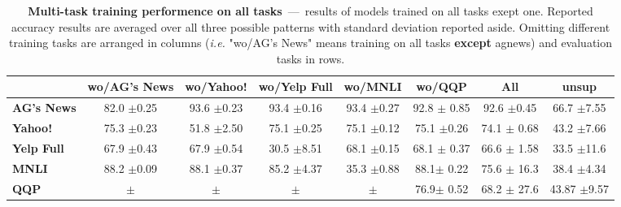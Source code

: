 \begin{table*}[ht]
	\centering
	\fontsize{9}{13}
	\selectfont
	\begin{tabular*}{\textwidth}{l@{\extracolsep{\fill}}ccccccc}
		\toprule
		& \textbf{wo/AG's News} & \textbf{wo/Yahoo!} & \textbf{wo/Yelp Full} & \textbf{wo/MNLI} & \textbf{wo/QQP} & \textbf{All} & \textbf{unsup} \\
		\hline
		\textbf{AG's News}    & 82.0 \tiny$\pm$0.25        & 93.6 \tiny$\pm$0.23        & 93.4   \tiny$\pm$0.16          & 93.4 \tiny$\pm$0.27       & 92.8 \tiny$\pm$ 0.85 & 92.6 \tiny$\pm$0.45 & 66.7 \tiny$\pm$7.55 \\
		\textbf{Yahoo!}     & 75.3 \tiny$\pm$0.23        & 51.8 \tiny$\pm$2.50        & 75.1   \tiny$\pm$0.25          & 75.1 \tiny$\pm$0.12       & 75.1 \tiny$\pm$0.26 & 74.1 \tiny$\pm$ 0.68  & 43.2 \tiny$\pm$7.66 \\
		\textbf{Yelp Full} & 67.9 \tiny$\pm$0.43        & 67.9 \tiny$\pm$0.54        & 30.5   \tiny$\pm$8.51          & 68.1 \tiny$\pm$0.15       & 68.1 \tiny$\pm$ 0.37 & 66.6 \tiny$\pm$ 1.58 & 33.5 \tiny$\pm$11.6 \\
		\textbf{MNLI}      & 88.2 \tiny$\pm$0.09        & 88.1 \tiny$\pm$0.37        & 85.2   \tiny$\pm$4.37          & 35.3 \tiny$\pm$0.88      & 88.1\tiny$\pm$ 0.22  & 75.6 \tiny$\pm$ 16.3 & 38.4 \tiny$\pm$4.34 \\
		\textbf{QQP}      &  \tiny$\pm$        &  \tiny$\pm$        &    \tiny$\pm$          &  \tiny$\pm$      & 76.9\tiny$\pm$ 0.52  & 68.2 \tiny$\pm$ 27.6 & 43.87 \tiny$\pm$9.57\\
		\bottomrule
	\end{tabular*}
	\caption{\textbf{Multi-task training performence on all tasks}~---~results of models trained on all tasks exept one. Reported accuracy results are averaged over all three possible patterns with standard deviation reported aside. Omitting different training tasks are arranged in columns (\textit{i.e.} "wo/AG's News" means training on all tasks \textbf{except} agnews) and evaluation tasks in rows.}\label{tab:multi-on-train-set-summary}
\end{table*}
